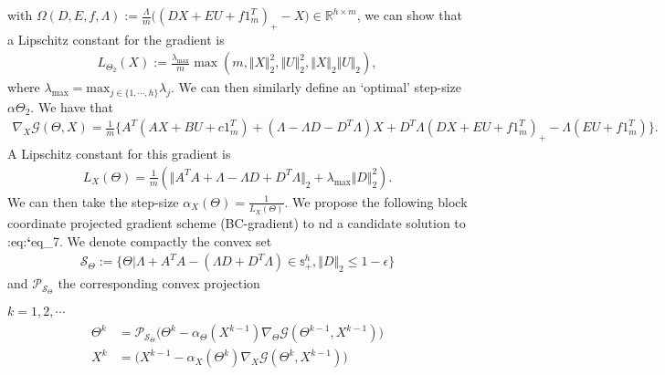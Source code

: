 \documentclass[letterpaper,10pt,english]{sphinxmanual}
\begin{document}
with \(\Omega(D,E,f,\Lambda) := \frac{\Lambda}{m}\bigg((DX + EU + f1_m^T)_+ - X \bigg) \in \mathbb{R}^{h \times m}\), we can show that a Lipschitz constant for the
gradient is
\begin{equation*}
\begin{split}L_{\Theta_2}(X) := \frac{\lambda_{\text{max}}}{m} \max(m,\Vert X \Vert_2^2,\Vert U \Vert_2^2,\Vert X \Vert_2 \Vert U \Vert_2),\end{split}
\end{equation*}
where \(\lambda_{\text{max}} = \text{max}_{j \in \{1,\cdots,h\}} \lambda_j\). We can then similarly define an ‘optimal’ step-size \(\alpha \Theta_2\).
We have that
\begin{equation*}
\begin{split}\nabla_X \mathcal{G}(\Theta,X) = \frac{1}{m} \bigg\{ A^T(AX + BU + c1_m^T) + (\Lambda - \Lambda D - D^T \Lambda)X + D^T \Lambda (DX + EU + f1_m^T)_+ - \Lambda(EU+f1_m^T) \bigg\}.\end{split}
\end{equation*}
A Lipschitz constant for this gradient is
\begin{equation*}
\begin{split}L_X(\Theta) = \frac{1}{m}(\Vert A^TA + \Lambda - \Lambda D + D^T\Lambda \Vert_2 + \lambda_{\text{max}} \Vert D \Vert_2^2).\end{split}
\end{equation*}
We can then take the step-size \(\alpha_X(\Theta) = \frac{1}{L_X(\Theta)}\). We propose the following block coordinate projected
gradient scheme (BC-gradient) to  nd a candidate solution to :eq:{\color{red}\bfseries{}{}`}eq\_7. We denote compactly the convex set
\begin{equation*}
\begin{split}\mathcal{S}_{\Theta} := \{\Theta \vert \Lambda + A^TA - (\Lambda D + D^T \Lambda) \in \mathbb{s}_+^h, \Vert D \Vert_2 \leq 1 - \epsilon \}\end{split}
\end{equation*}
and \(\mathcal{P}_{\mathcal{S}_{\Theta}}\) the corresponding convex projection

 \(k = 1, 2, \cdots\) 
\begin{equation*}
\begin{split}\begin{align}
    \Theta^k &= \mathcal{P}_{\mathcal{S}_{\Theta}}\bigg(\Theta^k - \alpha_{\Theta}(X^{k-1}) \nabla_{\Theta} \mathcal{G}(\Theta^{k-1},X^{k-1}) \bigg) \\
    X^k &= \bigg(X^{k-1} - \alpha_X(\Theta^k) \nabla_X \mathcal{G}(\Theta^k,X^{k-1}) \bigg)
\end{align}\end{split}
\end{equation*}
\end{document}
